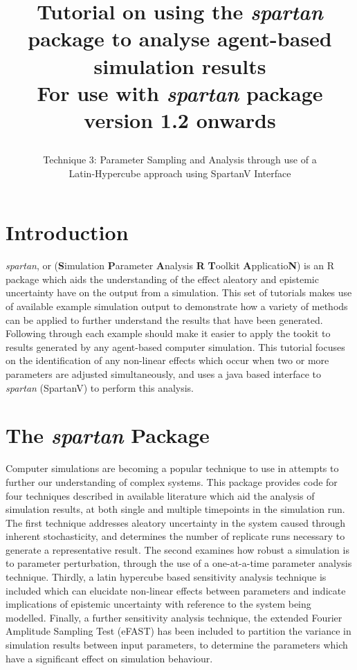 \documentclass[a4paper,11pt]{article}
\title{\huge \textbf{Tutorial on using the \textit{spartan} package to analyse agent-based simulation results}\\
\Large For use with \textit{spartan} package version 1.2 onwards
\author{\Large Technique 3: Parameter Sampling and Analysis through use of a \\ \Large Latin-Hypercube approach using SpartanV Interface}
\date{}
}
\begin{document}
\maketitle

\section{Introduction}
\noindent \textit{spartan}, or (\textbf{S}imulation \textbf{P}arameter \textbf{A}nalysis \textbf{R} \textbf{T}oolkit \textbf{A}pplicatio\textbf{N}) is an R package which aids the understanding of the effect aleatory and epistemic uncertainty have on the output from a simulation. This set of tutorials makes use of available example simulation output to demonstrate how a variety of methods can be applied to further understand the results that have been generated.  Following through each example should make it easier to apply the tookit to results generated by any agent-based computer simulation.  This tutorial focuses on the identification of any non-linear effects which occur when two or more parameters are adjusted simultaneously, and uses a java based interface to \textit{spartan} (SpartanV) to perform this analysis.

\section{The \textit{spartan} Package}
\noindent Computer simulations are becoming a popular technique to use in attempts to further our understanding of complex systems. This package provides code for four techniques described in available literature which aid the analysis of simulation results, at both single and multiple timepoints in the simulation run. The first technique addresses aleatory uncertainty in the system caused through inherent stochasticity, and determines the number of replicate runs necessary to generate a representative result. The second examines how robust a simulation is to parameter perturbation, through the use of a one-at-a-time parameter analysis technique. Thirdly, a latin hypercube based sensitivity analysis technique is included which can elucidate non-linear effects between parameters and indicate implications of epistemic uncertainty with reference to the system being modelled. Finally, a further sensitivity analysis technique, the extended Fourier Amplitude Sampling Test (eFAST) has been included to partition the variance in simulation results between input parameters, to determine the parameters which have a significant effect on simulation behaviour.
\end{document}
